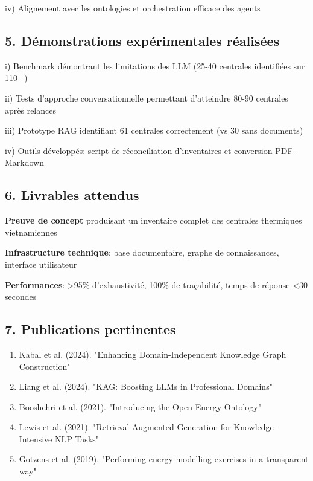 \documentclass[a4paper,11pt]{report}
\providecommand{\tightlist}{\setlength{\itemsep}{0pt}\setlength{\parskip}{0pt}}
\begin{document}
iv) Alignement avec les ontologies et orchestration efficace des agents

\subsection{5. Démonstrations expérimentales réalisées}\label{duxe9monstrations-expuxe9rimentales-ruxe9alisuxe9es}

i) Benchmark démontrant les limitations des LLM (25-40 centrales identifiées sur 110+)

ii) Tests d'approche conversationnelle permettant d'atteindre 80-90 centrales après relances

iii) Prototype RAG identifiant 61 centrales correctement (vs 30 sans documents)

iv) Outils développés: script de réconciliation d'inventaires et conversion PDF-Markdown

\subsection{6. Livrables attendus}\label{livrables-attendus}

\textbf{\textbf{Preuve de concept}} produisant un inventaire complet des centrales thermiques vietnamiennes

\textbf{\textbf{Infrastructure technique}}: base documentaire, graphe de connaissances, interface utilisateur

\textbf{\textbf{Performances}}: \textgreater95\% d'exhaustivité, 100\% de traçabilité, temps de réponse \textless30 secondes

\subsection{7. Publications pertinentes}\label{publications-pertinentes}

\begin{enumerate}
\def\labelenumi{\arabic{enumi}.}
\tightlist
\item
  Kabal et al. (2024). "Enhancing Domain-Independent Knowledge Graph Construction"
\item
  Liang et al. (2024). "KAG: Boosting LLMs in Professional Domains"
\item
  Booshehri et al. (2021). "Introducing the Open Energy Ontology"
\item
  Lewis et al. (2021). "Retrieval-Augmented Generation for Knowledge-Intensive NLP Tasks"
\item
  Gotzens et al. (2019). "Performing energy modelling exercises in a transparent way"
\end{enumerate}
\end{document}
